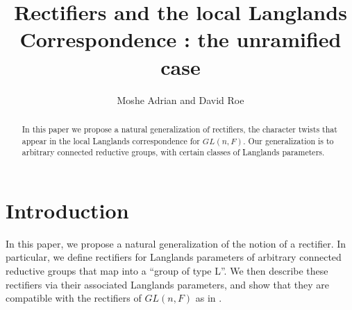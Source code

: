 \documentclass[11pt]{amsart}
\theoremstyle{plain}
\theoremstyle{definition}
\begin{document}
\title{Rectifiers and the local Langlands Correspondence : the unramified case}
\author{Moshe Adrian and David Roe}



\begin{abstract}

\maketitle

In this paper we propose a natural generalization of rectifiers, the
character twists that appear in the local Langlands correspondence for
$GL(n,F)$.  Our generalization is to arbitrary connected reductive
groups, with certain classes of Langlands parameters.

\end{abstract}

\section{Introduction}
In this paper, we propose a natural generalization of the notion of a
rectifier.  In particular, we define rectifiers for Langlands
parameters of arbitrary connected reductive groups that map into a
``group of type L''.  We then describe these rectifiers via their
associated Langlands parameters, and show that they are compatible
with the rectifiers of $GL(n,F)$ as in \cite{bushnellhenniart}.
\end{document}
